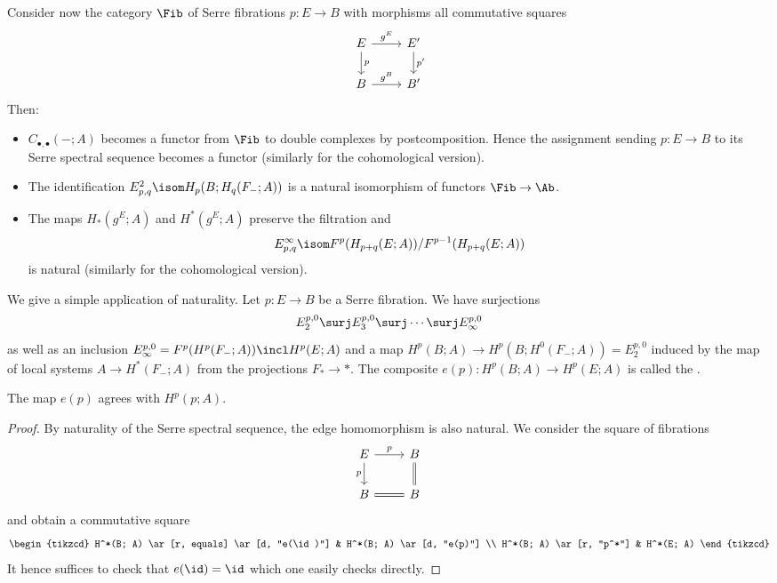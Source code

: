 Consider now the category $\Fib$ of Serre fibrations $p\colon E \to B$ with morphisms all commutative squares
\begin{equation*}
	\begin{tikzcd}
		E 
				\ar[r, "g^E"]
				\ar[d, "p"]
			& E'
				\ar[d, "p'"]
		\\
		B
				\ar[r, "g^B"]
			& B'
	\end{tikzcd}
\end{equation*}
Then:
\begin{itemize}
	\item $C_{\bullet, \bullet}({{-}}; A)$ becomes a functor from $\Fib$ to double complexes by postcomposition.
		Hence the assignment sending $p\colon E \to B$ to its Serre spectral sequence becomes a functor (similarly for the cohomological version).
	\item The identification $E^2_{p, q} \isom H_p(B; H_q(F_{-}; A))$ is a natural isomorphism of functors $\Fib \to \Ab$.
	\item The maps $H_*(g^E; A)$ and $H^*(g^E; A)$ preserve the filtration and
		\begin{equation*}
			E^\infty_{p, q} \isom F^p(H_{p + q}(E; A)) / F^{p - 1}(H_{p + q}(E; A))
		\end{equation*}
		is natural (similarly for the cohomological version).
\end{itemize}
We give a simple application of naturality.
Let $p\colon E \to B$ be a Serre fibration.
We have surjections
\begin{equation*}
	E_2^{p, 0} \surj E_3^{p, 0} \surj \cdots \surj E_\infty^{p, 0}
\end{equation*}
as well as an inclusion $E_\infty^{p, 0} = F^p(H^p(F_{-}; A)) \incl H^p(E; A)$ and a map $H^p(B; A) \to H^p(B; H^0(F_{-}; A)) = E_2^{p, 0}$ induced by the map of local systems $A \to H^*(F_{-}; A)$ from the projections $F_* \to *$.
The composite $e(p)\colon H^p(B; A) \to H^p(E; A)$ is called the .
\begin{lemma}
	The map $e(p)$ agrees with $H^p(p; A)$.
\end{lemma}
\begin{proof}
	By naturality of the Serre spectral sequence, the edge homomorphism is also natural.
	We consider the square of fibrations
	\begin{equation*}
		\begin{tikzcd}
			E
				\ar[r, "p"]
				\ar[d, swap, "p"]
				& B
					\ar[d, equals]
			\\
			B
					\ar[r, equals]
				& B
		\end{tikzcd}
	\end{equation*}
	and obtain a commutative square
	\begin{equation*}
		\begin{tikzcd}
			H^*(B; A)
					\ar[r, equals]
					\ar[d, "e(\id)"]
				& H^*(B; A)
					\ar[d, "e(p)"]
			\\
			H^*(B; A)
					\ar[r, "p^*"]
				& H^*(E; A)
		\end{tikzcd}
	\end{equation*}
	It hence suffices to check that $e(\id) = \id$ which one easily checks directly.
\end{proof}
